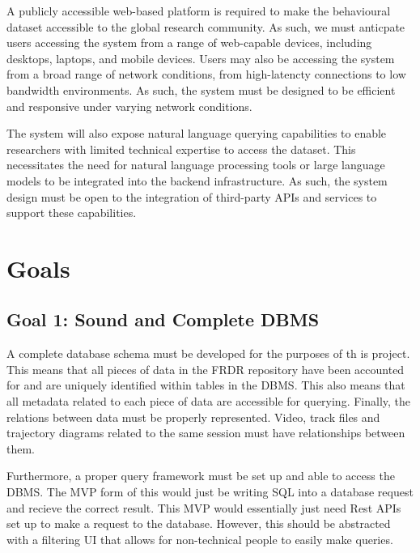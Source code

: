 \documentclass{article}
\begin{document}
\par{
  A publicly accessible web-based platform is required to make the behavioural dataset accessible to the global research community. As such, we must anticpate users accessing the system from a range of web-capable devices, including desktops, laptops, and mobile devices. Users may also be accessing the system from a broad range of network conditions, from high-latencty connections to low bandwidth environments. As such, the system must be designed to be efficient and responsive under varying network conditions. 
}

\par{
  The system will also expose natural language querying capabilities to enable researchers with limited technical expertise to access the dataset. This necessitates the need for natural language processing tools or large language models to be integrated into the backend infrastructure. As such, the system design must be open to the integration of third-party APIs and services to support these capabilities.
}


\section{Goals}

  \subsection{Goal 1: Sound and Complete DBMS} 
  
  \par{ A complete database schema must be developed for the purposes
  of th is project. This means that all pieces of data in the FRDR repository have
  been accounted for and are uniquely identified within tables in the DBMS. This also means that
  all metadata related to each piece of data are accessible for querying. Finally,
  the relations between data must be properly represented. Video, track files and trajectory diagrams
  related to the same session must have relationships between them.
  
  Furthermore, a proper query framework must be set up and able to access the DBMS. 
  The MVP form of this would just be writing SQL into a database request and
  recieve the correct result. This MVP would essentially just need Rest APIs set up
  to make a request to the database. However, this should be abstracted with a filtering UI that
  allows for non-technical people to easily make queries.}
\end{document}

